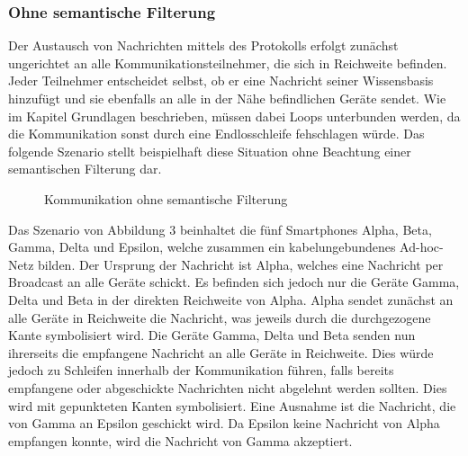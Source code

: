 \subsubsection{Ohne semantische Filterung}
Der Austausch von Nachrichten mittels des Protokolls erfolgt zunächst ungerichtet an alle Kommunikationsteilnehmer, die sich in Reichweite befinden. Jeder Teilnehmer entscheidet selbst, ob er eine Nachricht seiner Wissensbasis hinzufügt und sie ebenfalls an alle in der Nähe befindlichen Geräte sendet. Wie im Kapitel Grundlagen beschrieben, müssen dabei Loops unterbunden werden, da die Kommunikation sonst durch eine Endlosschleife fehschlagen würde. Das folgende Szenario stellt beispielhaft diese Situation ohne Beachtung einer semantischen  Filterung dar.
\begin{figure}[H]
	\centering
	\hspace*{1cm}
	\caption{Kommunikation ohne semantische Filterung}
	\label{fig:beispielszenario}
\end{figure}
Das Szenario von Abbildung 3 beinhaltet die fünf Smartphones Alpha, Beta, Gamma, Delta und Epsilon, welche zusammen ein kabelungebundenes Ad-hoc-Netz bilden. Der Ursprung der Nachricht ist Alpha, welches eine Nachricht per Broadcast an alle Geräte schickt. Es befinden sich jedoch nur die Geräte Gamma, Delta und Beta in der direkten Reichweite von Alpha. Alpha sendet zunächst an alle Geräte in Reichweite die Nachricht, was jeweils durch die durchgezogene Kante symbolisiert wird. Die Geräte Gamma, Delta und Beta senden nun ihrerseits die empfangene Nachricht an alle Geräte in Reichweite. Dies würde jedoch zu Schleifen innerhalb der Kommunikation führen, falls bereits empfangene oder abgeschickte Nachrichten nicht abgelehnt werden sollten. Dies wird mit gepunkteten Kanten symbolisiert. Eine Ausnahme ist die Nachricht, die von Gamma an Epsilon geschickt wird. Da Epsilon keine Nachricht von Alpha empfangen konnte, wird die Nachricht von Gamma akzeptiert. 
